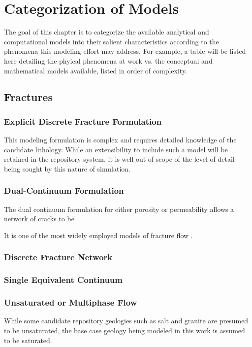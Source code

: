 \chapter{Categorization of Models}\label{ch:categorization}

The goal of this chapter is to categorize the available analytical and 
computational models into their salient characteristics according to the 
phenomena this modeling effort may address. For example, a table will be listed 
here detailing the phyical phenomena at work vs. the conceptual and 
mathematical models available, listed in order of complexity.




\section{Fractures}

\subsection{Explicit Discrete Fracture Formulation}

This modeling formulation is complex and requires detailed knowledge of the 
candidate lithology. While an extensibility to include such a model will be 
retained in the repository system, it is well out of scope of the level of 
detail being sought by this nature of simulation. 

\subsection{Dual-Continuum Formulation}

The dual continuum formulation for either porosity or permeability allows a 
network of cracks to be  

It is one of the most widely employed models of fracture flow 
\cite{diodato_compendium_1994}.

\subsection{Discrete Fracture Network}
\subsection{Single Equivalent Continuum}

\subsection{Unsaturated or Multiphase Flow}
While some candidate repository geologies such as salt and granite are presumed 
to be unsaturated, the base case geology being modeled in this work is assumed 
to be saturated.


